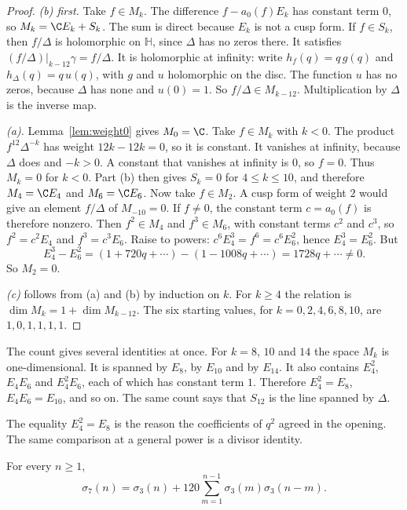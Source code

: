 \begin{proof}
\emph{(b) first.} Take $f\in M_k$. The difference $f-a_0(f)E_k$ has constant term $0$, so $M_k=\C E_k+S_k$. The sum is direct because $E_k$ is not a cusp form. If $f\in S_k$, then $f/\Delta$ is holomorphic on $\mathbb H$, since $\Delta$ has no zeros there. It satisfies $(f/\Delta)|_{k-12}\gamma=f/\Delta$. It is holomorphic at infinity: write $h_f(q)=q\,g(q)$ and $h_\Delta(q)=q\,u(q)$, with $g$ and $u$ holomorphic on the disc. The function $u$ has no zeros, because $\Delta$ has none and $u(0)=1$. So $f/\Delta\in M_{k-12}$. Multiplication by $\Delta$ is the inverse map.

\emph{(a).} Lemma~\ref{lem:weight0} gives $M_0=\C$. Take $f\in M_k$ with $k<0$. The product $f^{12}\Delta^{-k}$ has weight $12k-12k=0$, so it is constant. It vanishes at infinity, because $\Delta$ does and $-k>0$. A constant that vanishes at infinity is $0$, so $f=0$. Thus $M_k=0$ for $k<0$. Part (b) then gives $S_k=0$ for $4\le k\le10$, and therefore $M_4=\C E_4$ and $M_6=\C E_6$. Now take $f\in M_2$. A cusp form of weight $2$ would give an element $f/\Delta$ of $M_{-10}=0$. If $f\ne0$, the constant term $c=a_0(f)$ is therefore nonzero. Then $f^2\in M_4$ and $f^3\in M_6$, with constant terms $c^2$ and $c^3$, so $f^2=c^2E_4$ and $f^3=c^3E_6$. Raise to powers: $c^6E_4^3=f^6=c^6E_6^2$, hence $E_4^3=E_6^2$. But
\[
E_4^3-E_6^2=(1+720q+\cdots)-(1-1008q+\cdots)=1728q+\cdots\ne0.
\]
So $M_2=0$.

\emph{(c)} follows from (a) and (b) by induction on $k$. For $k\ge4$ the relation is $\dim M_k=1+\dim M_{k-12}$. The six starting values, for $k=0,2,4,6,8,10$, are $1,0,1,1,1,1$.
\end{proof}

The count gives several identities at once. For $k=8$, $10$ and $14$ the space $M_k$ is one-dimensional. It is spanned by $E_8$, by $E_{10}$ and by $E_{14}$. It also contains $E_4^2$, $E_4E_6$ and $E_4^2E_6$, each of which has constant term $1$. Therefore $E_4^2=E_8$, $E_4E_6=E_{10}$, and so on. The same count says that $S_{12}$ is the line spanned by $\Delta$.

The equality $E_4^2=E_8$ is the reason the coefficients of $q^2$ agreed in the opening. The same comparison at a general power is a divisor identity.

\begin{corollary}\label{cor:sigma7}
For every $n\ge1$,
\[
\sigma_7(n)=\sigma_3(n)+120\sum_{m=1}^{n-1}\sigma_3(m)\sigma_3(n-m).
\]
\end{corollary}

